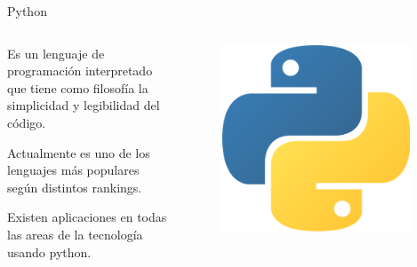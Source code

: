 \documentclass[10pt]{beamer}
\begin{document}
\begin{frame}{Python}
    \begin{columns}
        \begin{column}{0.6\textwidth}
            Es un lenguaje de programación interpretado que tiene como filosofía la simplicidad y 
            legibilidad del código.
            
            Actualmente es uno de los lenguajes más populares según distintos rankings.
            
            Existen aplicaciones en todas las areas de la tecnología usando python.

        \end{column}
        \begin{column}{0.4\textwidth}
            \begin{figure}[!h] 
                \centering
                \includegraphics[width=0.95\textwidth]{img/logo}
            \end{figure}
        \end{column}
    \end{columns}
    
\end{frame}
\end{document}
